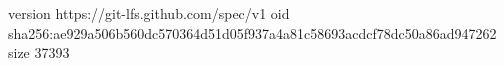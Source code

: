 version https://git-lfs.github.com/spec/v1
oid sha256:ae929a506b560dc570364d51d05f937a4a81c58693acdcf78dc50a86ad947262
size 37393
